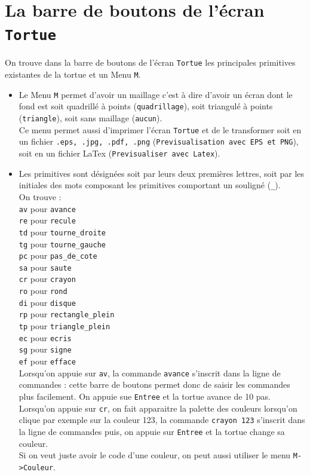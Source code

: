 \documentclass[a4paper,11pt]{book}
\begin{document}
\section{La barre de boutons de l'\'ecran {\tt Tortue}}
On trouve dans la barre de boutons de l'\'ecran {\tt Tortue} les principales
primitives existantes de la tortue et un Menu {\tt M}.\\
\begin{itemize}
\item Le Menu {\tt M} permet d'avoir un maillage c'est \`a dire d'avoir un 
\'ecran dont le fond est soit quadrill\'e \`a points ({\tt quadrillage}), soit 
triangul\'e \`a points ({\tt triangle}), soit sans maillage ({\tt aucun}).\\
Ce menu permet aussi d'imprimer l'\'ecran {\tt Tortue} 
et de le transformer soit en un fichier {\tt .eps, .jpg, .pdf, .png}
({\tt Previsualisation avec EPS et PNG}), soit
en un fichier LaTex ({\tt Previsualiser avec Latex}). 
\item Les primitives sont d\'esign\'ees soit
par leurs deux premi\`eres lettres, soit par les initiales des mots composant 
les primitives comportant un soulign\'e ({\tt \_}).\\
On trouve :\\
{\tt av} pour {\tt avance}\\
{\tt re} pour {\tt recule}\\
{\tt td} pour {\tt tourne\_droite}\\
{\tt tg} pour {\tt tourne\_gauche}\\
{\tt pc} pour {\tt pas\_de\_cote}\\
{\tt sa} pour {\tt saute}\\
{\tt cr} pour {\tt crayon}\\
{\tt ro} pour {\tt rond}\\
{\tt di} pour {\tt disque}\\
{\tt rp} pour {\tt rectangle\_plein}\\
{\tt tp} pour {\tt triangle\_plein}\\
{\tt ec} pour {\tt ecris}\\
{\tt sg} pour {\tt signe}\\
{\tt ef} pour {\tt efface}\\
Lorsqu'on appuie sur {\tt av}, la commande {\tt avance} s'inscrit dans la 
ligne de commandes : cette barre de boutons permet donc de saisir les 
commandes plus facilement. On appuie sue {\tt Entree} et la tortue avance de 10 pas.\\
Lorsqu'on appuie sur {\tt cr}, on fait apparaitre la palette des couleurs
lorsqu'on clique par exemple sur la couleur 123, la commande {\tt crayon 123} 
s'inscrit dans la ligne de commandes puis, on appuie sur {\tt Entree} et la 
tortue change sa couleur.\\
Si on veut juste avoir le code d'une couleur, on peut aussi utiliser le menu 
{\tt M->Couleur}.
\end{itemize}
\end{document}
